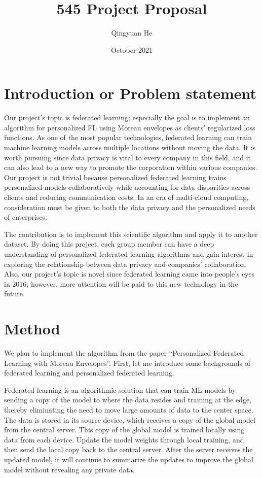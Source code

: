 \documentclass{article}
\title{545 Project Proposal}
\author{Qingyuan He}
\date{October 2021}
\begin{document}
\maketitle

\section{Introduction or Problem statement}
Our project’s topic is federated learning; especially the goal is to implement an algorithm for personalized FL using Moreau envelopes as clients’ regularized loss functions. As one of the most popular technologies, federated learning can train machine learning models across multiple locations without moving the data. It is worth pursuing since data privacy is vital to every company in this field, and it can also lead to a new way to promote the corporation within various companies. Our project is not trivial because personalized federated learning trains personalized models collaboratively while accounting for data disparities across clients and reducing communication costs. In an era of multi-cloud computing, consideration must be given to both the data privacy and the personalized needs of enterprises.

The contribution is to implement this scientific algorithm and apply it to another dataset. By doing this project, each group member can have a deep understanding of personalized federated learning algorithms and gain interest in exploring the relationship between data privacy and companies’ collaboration. Also, our project’s topic is novel since federated learning came into people’s eyes in 2016; however, more attention will be paid to this new technology in the future.

\section{Method}

We plan to implement the algorithm from the paper “Personalized Federated Learning with Moreau Envelopes”. First, let me introduce some backgrounds of federated learning and personalized federated learning. 

Federated learning is an algorithmic solution that can train ML models by sending a copy of the model to where the data resides and training at the edge, thereby eliminating the need to move large amounts of data to the center space. The data is stored in its source device, which receives a copy of the global model from the central server. This copy of the global model is trained locally using data from each device. Update the model weights through local training, and then send the local copy back to the central server. After the server receives the updated model, it will continue to summarize the updates to improve the global model without revealing any private data. 
\end{document}
